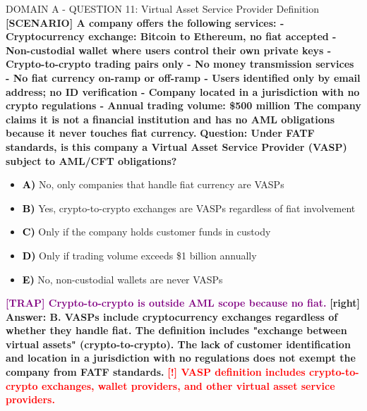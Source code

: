 \documentclass[11pt,a4paper]{beamer}
\newcommand{\redflag}[1]{\textcolor{red}{\textbf{[!] #1}}}
\newcommand{\trap}[1]{\textcolor{purple}{\textbf{[TRAP] #1}}}
\newcommand{\correct}[1]{\textcolor{green!50!black}{\textbf{[right] #1}}}
\newcommand{\scenario}[1]{\textcolor{blue!70!black}{\textbf{[SCENARIO] #1}}}
\newcommand{\option}[1]{\textcolor{black}{\textbf{#1}}}
\begin{document}
\begin{frame}{DOMAIN A - QUESTION 11: Virtual Asset Service Provider Definition}
\scenario{A company offers the following services:
- Cryptocurrency exchange: Bitcoin to Ethereum, no fiat accepted
- Non-custodial wallet where users control their own private keys
- Crypto-to-crypto trading pairs only
- No money transmission services
- No fiat currency on-ramp or off-ramp
- Users identified only by email address; no ID verification
- Company located in a jurisdiction with no crypto regulations
- Annual trading volume: \$500 million
The company claims it is not a financial institution and has no AML obligations because it never touches fiat currency.}
\vspace{0.2cm}
\textbf{Question: Under FATF standards, is this company a Virtual Asset Service Provider (VASP) subject to AML/CFT obligations?}
\vspace{0.1cm}
\begin{itemize}
    \item \option{A)} No, only companies that handle fiat currency are VASPs
    \item \option{B)} Yes, crypto-to-crypto exchanges are VASPs regardless of fiat involvement
    \item \option{C)} Only if the company holds customer funds in custody
    \item \option{D)} Only if trading volume exceeds \$1 billion annually
    \item \option{E)} No, non-custodial wallets are never VASPs
\end{itemize}
\vspace{0.2cm}
\trap{Crypto-to-crypto is outside AML scope because no fiat.}
\correct{Answer: B. VASPs include cryptocurrency exchanges regardless of whether they handle fiat. The definition includes "exchange between virtual assets" (crypto-to-crypto). The lack of customer identification and location in a jurisdiction with no regulations does not exempt the company from FATF standards.}
\redflag{VASP definition includes crypto-to-crypto exchanges, wallet providers, and other virtual asset service providers.}
\end{frame}
\end{document}
